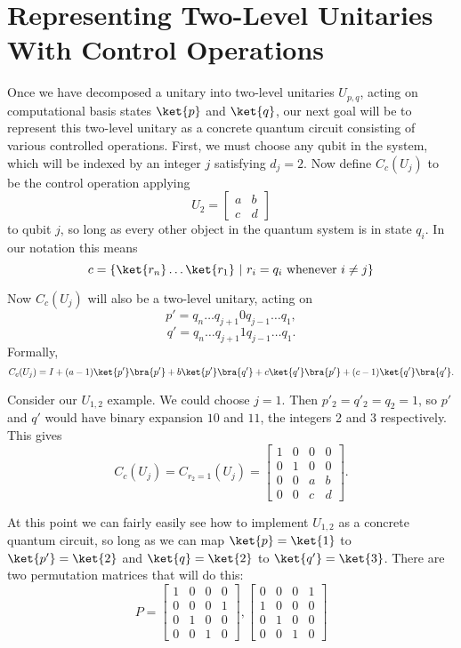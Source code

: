 \section{Representing Two-Level Unitaries With Control Operations}
Once we have decomposed a unitary into two-level unitaries $U_{p,q}$, acting on computational basis states $\ket{p}$ and $\ket{q}$, our next goal will be to represent this two-level unitary as a concrete quantum circuit consisting of various controlled operations. First, we must choose any qubit in the system, which will be indexed by an integer $j$ satisfying $d_j = 2$. Now define $C_c(U_j)$ to be the control operation applying 
\[U_2 = \begin{bmatrix}
a & b \\
c & d
\end{bmatrix}\]
to qubit $j$, so long as every other object in the quantum system is in state $q_i$. In our notation this means
\[c = \{\ket{r_n}\dots\ket{r_1}\ |\ r_i = q_i \text{\ whenever\ } i \neq j\}\]

Now $C_c(U_j)$ will also be a two-level unitary, acting on
\[p' = q_n \dots q_{j+1} 0 q_{j-1} \dots q_1,\]
\[q' = q_n \dots q_{j+1} 1 q_{j-1} \dots q_1.\]
Formally,
\[C_c(U_j) = I + (a-1)\ket{p'}\bra{p'} + b\ket{p'}\bra{q'}+ c\ket{q'}\bra{p'}+ (c-1)\ket{q'}\bra{q'}.\]

Consider our $U_{1,2}$ example. We could choose $j = 1$. Then $p'_2 = q'_2 = q_2 = 1$, so $p'$ and $q'$ would have binary expansion $10$ and $11$, the integers 2 and 3 respectively. This gives
\[C_c(U_j) = C_{r_2=1}(U_j) = \begin{bmatrix}
	1 & 0 & 0 & 0 \\
	0 & 1 & 0 & 0 \\
	0 & 0 & a & b \\
	0 & 0 & c & d
\end{bmatrix}.
\]

At this point we can fairly easily see how to implement $U_{1,2}$ as a concrete quantum circuit, so long as we can map $\ket{p}=\ket{1}$ to $\ket{p'} = \ket{2}$ and $\ket{q}=\ket{2}$ to $\ket{q'}=\ket{3}$. There are two permutation matrices that will do this:
\[P = \begin{bmatrix}
	1 & 0 & 0 & 0 \\
	0 & 0 & 0 & 1 \\
	0 & 1 & 0 & 0 \\
	0 & 0 & 1 & 0
\end{bmatrix}, \begin{bmatrix}
	0 & 0 & 0 & 1 \\
	1 & 0 & 0 & 0 \\
	0 & 1 & 0 & 0 \\
	0 & 0 & 1 & 0
\end{bmatrix}\]

